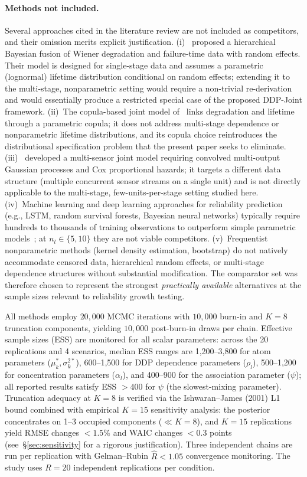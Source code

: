 \documentclass[a4paper,fleqn,longmktitle]{cas-sc}
\begin{document}
\paragraph{Methods not included.} Several approaches cited in the literature review are not included as competitors, and their omission merits explicit justification. (i)~\cite{Fu2024} proposed a hierarchical Bayesian fusion of Wiener degradation and failure-time data with random effects. Their model is designed for single-stage data and assumes a parametric (lognormal) lifetime distribution conditional on random effects; extending it to the multi-stage, nonparametric setting would require a non-trivial re-derivation and would essentially produce a restricted special case of the proposed DDP-Joint framework. (ii)~The copula-based joint model of~\cite{Hao2024} links degradation and lifetime through a parametric copula; it does not address multi-stage dependence or nonparametric lifetime distributions, and its copula choice reintroduces the distributional specification problem that the present paper seeks to eliminate. (iii)~\cite{Fard2025} developed a multi-sensor joint model requiring convolved multi-output Gaussian processes and Cox proportional hazards; it targets a different data structure (multiple concurrent sensor streams on a single unit) and is not directly applicable to the multi-stage, few-units-per-stage setting studied here. (iv)~Machine learning and deep learning approaches for reliability prediction (e.g., LSTM, random survival forests, Bayesian neural networks) typically require hundreds to thousands of training observations to outperform simple parametric models~\cite{Gelman2013}; at $n_l \in \{5,10\}$ they are not viable competitors. (v)~Frequentist nonparametric methods (kernel density estimation, bootstrap) do not natively accommodate censored data, hierarchical random effects, or multi-stage dependence structures without substantial modification. The comparator set was therefore chosen to represent the strongest \emph{practically available} alternatives at the sample sizes relevant to reliability growth testing.

All methods employ $20{,}000$ MCMC iterations with $10{,}000$ burn-in and $K = 8$ truncation components, yielding $10{,}000$ post-burn-in draws per chain. Effective sample sizes (ESS) are monitored for all scalar parameters: across the 20 replications and 4 scenarios, median ESS ranges are 1,200--3,800 for atom parameters ($\mu_k^*, \sigma_k^{2*}$), 600--1,500 for DDP dependence parameters ($\rho_l$), 500--1,200 for concentration parameters ($\alpha_l$), and 400--900 for the association parameter ($\psi$); all reported results satisfy ESS $> 400$ for $\psi$ (the slowest-mixing parameter). Truncation adequacy at $K=8$ is verified via the Ishwaran--James (2001) L1 bound combined with empirical $K=15$ sensitivity analysis: the posterior concentrates on 1--3 occupied components ($\ll K=8$), and $K=15$ replications yield RMSE changes $<1.5\%$ and WAIC changes $<0.3$ points (see~\S\ref{sec:sensitivity} for a rigorous justification). Three independent chains are run per replication with Gelman--Rubin $\widehat{R} < 1.05$ convergence monitoring. The study uses $R = 20$ independent replications per condition.
\end{document}
